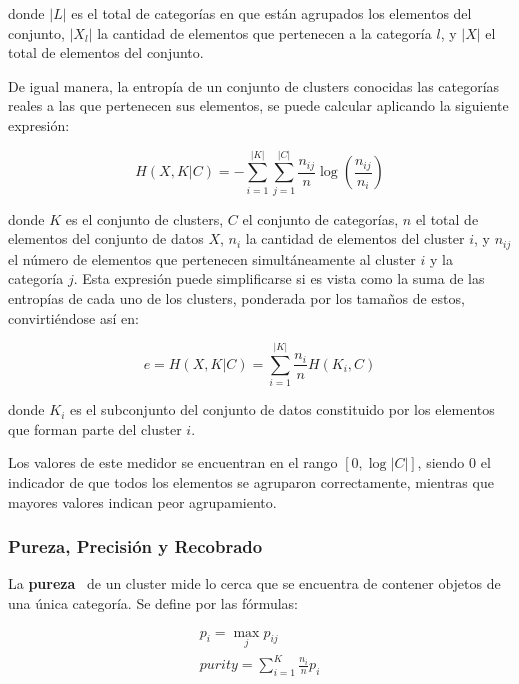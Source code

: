 \noindent
donde $|L|$ es el total de categorías en que están agrupados los elementos del conjunto, $|X_l|$ la cantidad de elementos que pertenecen a la categoría $l$, y $|X|$ el total de elementos del conjunto.

De igual manera, la entropía de un conjunto de clusters conocidas las categorías reales a las que pertenecen sus elementos, se puede calcular aplicando la siguiente expresión:

\begin{equation}
    \label{eq:clustering-entropy-conditional}
    H(X, K|C) = -\sum_{i=1}^{|K|}\sum_{j=1}^{|C|}{\frac{n_{ij}}{n}\log \left( \frac{n_{ij}}{n_i} \right)}
\end{equation}

\noindent
donde $K$ es el conjunto de clusters, $C$ el conjunto de categorías, $n$ el total de elementos del conjunto de datos $X$, $n_i$ la cantidad de elementos del cluster $i$, y $n_{ij}$ el número de elementos que pertenecen simultáneamente al cluster $i$ y la categoría $j$.
Esta expresión puede simplificarse si es vista como la suma de las entropías de cada uno de los clusters, ponderada por los tamaños de estos, convirtiéndose así en:

\begin{equation}
    \label{eq:clustering-entropy}
    e = H(X, K|C) = \sum_{i=1}^{|K|}{\frac{n_i}{n}H(K_i,C)}
\end{equation}

\noindent
donde $K_i$ es el subconjunto del conjunto de datos constituido por los elementos que forman parte del cluster $i$.

Los valores de este medidor se encuentran en el rango $[0, \log|C|]$, siendo 0 el indicador de que todos los elementos se agruparon correctamente, mientras que mayores valores indican peor agrupamiento.

\subsubsection{Pureza, Precisión y Recobrado}

La \textbf{pureza}~\cite{Aggarawal13,Tan05} de un cluster mide lo cerca que se encuentra de contener objetos de una única categoría.
Se define por las fórmulas:

\begin{gather}
    \label{eq:cluster-purity}
    p_i =\max_{j}{p_{ij}} \\
    \label{eq:purity}
    purity = \sum_{i=1}^{K}{\frac{n_i}{n}p_i}
\end{gather}

